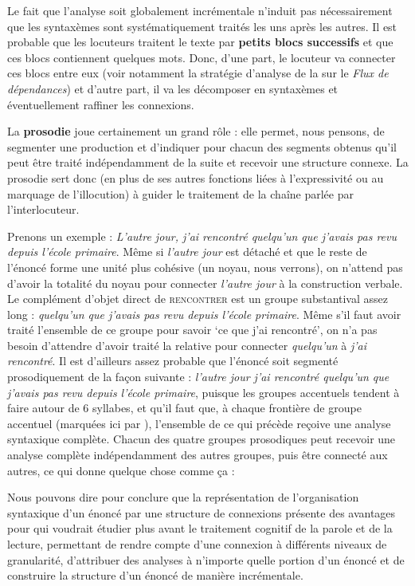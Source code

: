 {    Le fait que l’analyse soit globalement incrémentale n’induit pas nécessairement que les syntaxèmes sont systématiquement traités les uns après les autres. Il est probable que les locuteurs traitent le texte par \textbf{petits blocs successifs} et que ces blocs contiennent quelques mots. Donc, d’une part, le locuteur va connecter ces blocs entre eux (voir notamment la stratégie d’analyse de la  sur le \textit{Flux de dépendances}) et d’autre part, il va les décomposer en syntaxèmes et éventuellement raffiner les connexions.

    La \textbf{prosodie} joue certainement un grand rôle : elle permet, nous pensons, de segmenter une production et d’indiquer pour chacun des segments obtenus qu’il peut être traité indépendamment de la suite et recevoir une structure connexe. La prosodie sert donc (en plus de ses autres fonctions liées à l’expressivité ou au marquage de l’illocution) à guider le traitement de la chaîne parlée par l’interlocuteur.

    Prenons un exemple : \textit{L’autre jour, j’ai rencontré quelqu’un que j’avais pas revu depuis l’école primaire}. Même si \textit{l’autre jour} est détaché et que le reste de l’énoncé forme une unité plus cohésive (un noyau, nous verrons), on n’attend pas d’avoir la totalité du noyau pour connecter \textit{l’autre jour} à la construction verbale. Le complément d’objet direct de \textsc{rencontrer} est un groupe substantival assez long : \textit{quelqu’un que j’avais pas revu depuis l’école primaire}. Même s’il faut avoir traité l’ensemble de ce groupe pour savoir ‘ce que j’ai rencontré’, on n’a pas besoin d’attendre d’avoir traité la relative pour connecter \textit{quelqu’un} à \textit{j’ai rencontré}. Il est d’ailleurs assez probable que l’énoncé soit segmenté prosodiquement de la façon suivante : \textit{l’autre jour {\textbar} j’ai rencontré quelqu’un {\textbar} que j’avais pas revu {\textbar} depuis l’école primaire}, puisque les groupes accentuels tendent à faire autour de 6 syllabes, et qu’il faut que, à chaque frontière de groupe accentuel (marquées ici par {\textbar} ), l’ensemble de ce qui précède reçoive une analyse syntaxique complète. Chacun des quatre groupes prosodiques peut recevoir une analyse complète indépendamment des autres groupes, puis être connecté aux autres, ce qui donne quelque chose comme ça :




    Nous pouvons dire pour conclure que la représentation de l’organisation syntaxique d’un énoncé par une structure de connexions présente des avantages pour qui voudrait étudier plus avant le traitement cognitif de la parole et de la lecture, permettant de rendre compte d’une connexion à différents niveaux de granularité, d’attribuer des analyses à n’importe quelle portion d’un énoncé et de construire la structure d’un énoncé de manière incrémentale.
}
